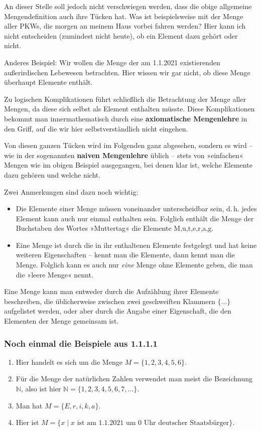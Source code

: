 An dieser Stelle soll jedoch nicht verschwiegen werden, dass die obige allgemeine Mengendefinition auch ihre Tücken hat. Was ist beispielsweise mit der Menge aller PKWs, die morgen an meinem Haus vorbei fahren werden? Hier kann ich nicht entscheiden (zumindest nicht heute), ob ein Element dazu gehört oder nicht.

Anderes Beispiel: Wir wollen die Menge der am 1.1.2021 existierenden außerirdischen Lebewesen betrachten. Hier wissen wir gar nicht, ob diese Menge überhaupt Elemente enthält.

Zu logischen Komplikationen führt schließlich die Betrachtung der Menge aller Mengen, da diese sich selbst als Element enthalten müsste. Diese Komplikationen bekommt man innermathematisch durch eine \textbf{axiomatische Mengenlehre} in den Griff, auf die wir hier selbstverständlich nicht eingehen.

Von diesen ganzen Tücken wird im Folgenden ganz abgesehen, sondern es wird -- wie in der sogenannten \textbf{naiven Mengenlehre} üblich -- stets von »einfachen« Mengen wie im obigen Beispiel ausgegangen, bei denen klar ist, welche Elemente dazu gehören und welche nicht.

Zwei Anmerkungen sind dazu noch wichtig:
\begin{itemize}
  \item Die Elemente einer Menge müssen voneinander unterscheidbar sein, d.\,h. jedes Element kann auch nur einmal enthalten sein. Folglich enthält die Menge der Buchstaben des Wortes »Muttertag« die Elemente M,u,t,e,r,a,g.
  \item Eine Menge ist durch die in ihr enthaltenen Elemente festgelegt und hat keine weiteren Eigenschaften -- kennt man die Elemente, dann kennt man die Menge. Folglich kann es auch nur \emph{eine} Menge ohne Elemente geben, die man die »leere Menge« nennt.
\end{itemize}

Eine Menge kann man entweder durch die Aufzählung ihrer Elemente beschreiben, die üblicherweise zwischen zwei geschweiften Klammern $\{\ldots\}$ aufgelistet werden, oder aber durch die Angabe einer Eigenschaft, die den Elementen der Menge gemeinsam ist.

\subsubsection{Noch einmal die Beispiele aus 1.1.1.1}

\begin{enumerate}[label=\alph*)]
  \item Hier handelt es sich um die Menge $M = \{1,2,3,4,5,6\}$.
  \item Für die Menge der natürlichen Zahlen verwendet man meist die Bezeichnung $\mathbb{N}$, also ist hier $\mathbb{N} = \{1,2,3,4,5,6,7,\ldots\}$.
  \item Man hat $M = \{E, r, i, k, a\}$.
  \item Hier ist $M = \{x \mid x \text{ ist am } 1.1.2021 \text{ um } 0 \text{ Uhr deutscher Staatsbürger}\}$.\beispielende
\end{enumerate}

